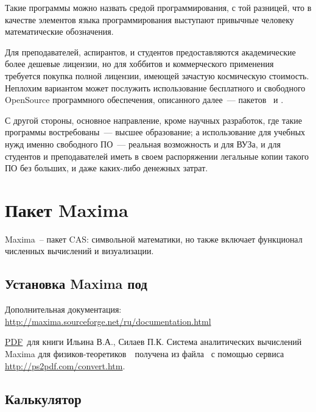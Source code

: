 Такие программы можно назвать средой программирования, с той разницей, что в
качестве элементов языка программирования выступают привычные человеку
математические обозначения.

Для преподавателей, аспирантов, и студентов предоставляются академические более
дешевые лицензии, но для хоббитов и коммерческого применения требуется покупка
полной лицензии, имеющей зачастую космическую стоимость. Неплохим вариантом
может послужить использование бесплатного и свободного OpenSource программного
обеспечения, описанного далее\ --- пакетов \  и .

С другой стороны, основное направление, кроме научных разработок, где такие
программы востребованы\ --- высшее образование; а использование для учебных нужд
именно свободного ПО\ --- реальная возможность и для ВУЗа, и для студентов и
преподавателей иметь в своем распоряжении легальные копии такого ПО без больших,
и даже каких-либо денежных затрат.

\chapter{Пакет Maxima}

Maxima\ -- пакет CAS: символьной математики, но также включает функционал
численных вычислений и визуализации.

\section{Установка Maxima под \win}









\bigskip
Дополнительная документация:
\url{http://maxima.sourceforge.net/ru/documentation.html}

\bigskip
\href{https://drive.google.com/file/d/0B0u4WeMjO894M01wZmNkSW9GRHM/view?usp=sharing}{PDF}\
для книги Ильина В.А., Силаев П.К. Система аналитических вычислений Maxima для
физиков-теоретиков\ \cite{maxphis}\ получена из файла \file{.ps}\ с помощью
сервиса \url{http://ps2pdf.com/convert.htm}.

\section{Калькулятор}


